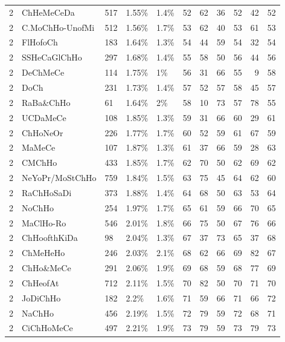 \begin{longtable}{lllllrrrrrr}
  2 & ChHeMeCeDa & 517 & 1.55\% & 1.4\% &  52 &  62 &  36 &  52 &  42 &  52 \\ 
  2 & C.MoChHo-UnofMi & 512 & 1.56\% & 1.7\% &  53 &  62 &  40 &  53 &  61 &  53 \\ 
  2 & FlHofoCh & 183 & 1.64\% & 1.3\% &  54 &  44 &  59 &  54 &  32 &  54 \\ 
  2 & SSHeCaGlChHo & 297 & 1.68\% & 1.4\% &  55 &  58 &  50 &  56 &  44 &  56 \\ 
  2 & DeChMeCe & 114 & 1.75\% & 1\% &  56 &  31 &  66 &  55 &   9 &  58 \\ 
  2 & DoCh & 231 & 1.73\% & 1.4\% &  57 &  52 &  57 &  58 &  45 &  57 \\ 
  2 & RaBa\&ChHo & 61 & 1.64\% & 2\% &  58 &  10 &  73 &  57 &  78 &  55 \\ 
  2 & UCDaMeCe & 108 & 1.85\% & 1.3\% &  59 &  31 &  66 &  60 &  29 &  61 \\ 
  2 & ChHoNeOr & 226 & 1.77\% & 1.7\% &  60 &  52 &  59 &  61 &  67 &  59 \\ 
  2 & MaMeCe & 107 & 1.87\% & 1.3\% &  61 &  37 &  66 &  59 &  28 &  63 \\ 
  2 & CMChHo & 433 & 1.85\% & 1.7\% &  62 &  70 &  50 &  62 &  69 &  62 \\ 
  2 & NeYoPr/MoStChHo & 759 & 1.84\% & 1.5\% &  63 &  75 &  45 &  64 &  62 &  60 \\ 
  2 & RaChHoSaDi & 373 & 1.88\% & 1.4\% &  64 &  68 &  50 &  63 &  53 &  64 \\ 
  2 & NoChHo & 254 & 1.97\% & 1.7\% &  65 &  61 &  59 &  66 &  70 &  65 \\ 
  2 & MaClHo-Ro & 546 & 2.01\% & 1.8\% &  66 &  75 &  50 &  67 &  76 &  66 \\ 
  2 & ChHoofthKiDa & 98 & 2.04\% & 1.3\% &  67 &  37 &  73 &  65 &  37 &  68 \\ 
  2 & ChMeHeHo & 246 & 2.03\% & 2.1\% &  68 &  62 &  66 &  69 &  82 &  67 \\ 
  2 & ChHo\&MeCe & 291 & 2.06\% & 1.9\% &  69 &  68 &  59 &  68 &  77 &  69 \\ 
  2 & ChHeofAt & 712 & 2.11\% & 1.5\% &  70 &  82 &  50 &  70 &  71 &  70 \\ 
  2 & JoDiChHo & 182 & 2.2\% & 1.6\% &  71 &  59 &  66 &  71 &  66 &  72 \\ 
  2 & NaChHo & 456 & 2.19\% & 1.5\% &  72 &  79 &  59 &  72 &  68 &  71 \\ 
  2 & CiChHoMeCe & 497 & 2.21\% & 1.9\% &  73 &  79 &  59 &  73 &  79 &  73 \\ 

\end{longtable}
